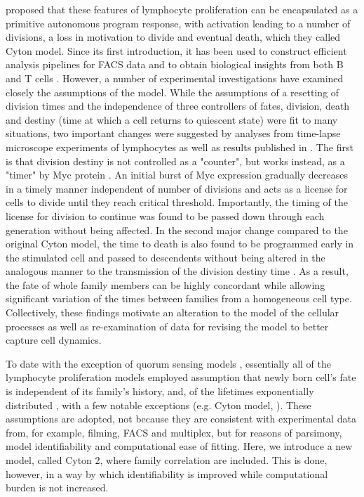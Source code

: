 \documentclass[11pt, a4paper]{article}
\begin{document}
\cite{Hawkins.2007} proposed that these features of lymphocyte proliferation can be encapsulated as a primitive autonomous program response, with activation leading to a number of divisions, a loss in motivation to divide and eventual death, which they called Cyton model. Since its first introduction, it has been used to construct efficient analysis pipelines for FACS data \parencite{Hawkins.2007owg, Shokhirev.2013} and to obtain biological insights from both B and T cells \parencite{Hawkins.2013, Marchingo.2014}. However, a number of experimental investigations have examined closely the assumptions of the model. While the assumptions of a resetting of division times and the independence of three controllers of fates, division, death and destiny (time at which a cell returns to quiescent state) were fit to many situations, two important changes were suggested by analyses from time-lapse microscope experiments of lymphocytes as well as results published in \cite{Heinzel.2016}. The first is that division destiny is not controlled as a "counter", but works instead, as a "timer" by Myc protein \parencite{Heinzel.2016}. An initial burst of Myc expression gradually decreases in a timely manner independent of number of divisions and acts as a license for cells to divide until they reach critical threshold. Importantly, the timing of the license for division to continue was found to be passed down through each generation without being affected. In the second major change compared to the original Cyton model, the time to death is also found to be programmed early in the stimulated cell and passed to descendents without being altered in the analogous manner to the transmission of the division destiny time \parencite{Heinzel.2016}. As a result, the fate of whole family members can be highly concordant while allowing significant variation of the times between families from a homogeneous cell type. Collectively, these findings motivate an alteration to the model of the cellular processes as well as re-examination of data for revising the model to better capture cell dynamics.

To date with the exception of quorum sensing models \parencite{Kannan.2018, Weber.2013}, essentially all of the lymphocyte proliferation models employed assumption that newly born cell's fate is independent of its family's history, and, of the lifetimes exponentially distributed \parencite{Mazzocco.2017, Banks.2012, Hasenauer.2012, Lee.2009, Yates.2007, Ganusov.2005, Revy.2001, Nordon.1999, Smith.1973}, with a few notable exceptions (e.g. Cyton model, \cite{Yates.2017, Shokhirev.2015, Hyrien.2010, Zilman.2010, Wellard.2010}). These assumptions are adopted, not because they are consistent with experimental data from, for example, filming, FACS and multiplex, but for reasons of parsimony, model identifiability and computational ease of fitting. Here, we introduce a new model, called Cyton 2, where family correlation are included. This is done, however, in a way by which identifiability is improved while computational burden is not increased.
\end{document}
